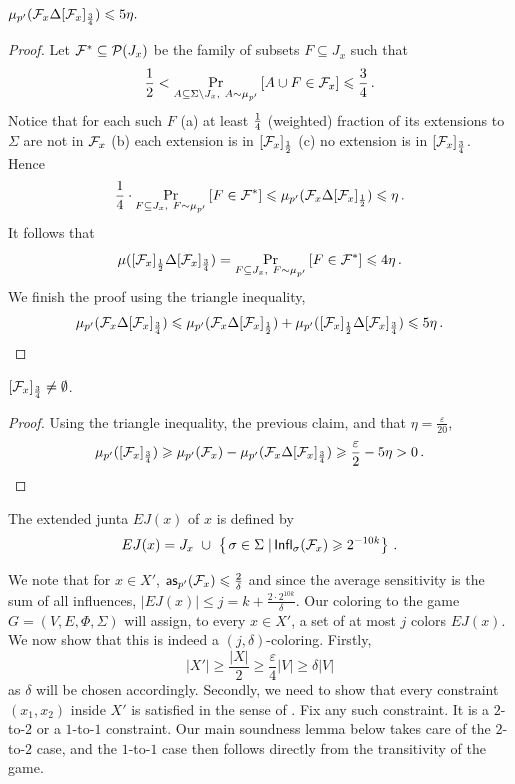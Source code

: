 \documentclass{toc}
\newcommand\sett[2]{\left\{ \left. #1 \;\right\vert #2 \right\}}
\newcommand\Prob[2]{{\Pr_{#1}\left[ {#2} \right]}}
\newcommand\half{{1\over2}}
\newcommand\quarter{{1\over4}}
\newcommand\eps{\varepsilon}
\renewcommand\geq{\geqslant}
\renewcommand\leq{\leqslant}
\begin{document}
\begin{claim}$
\mu_{p'}({\cal F}_x \Delta [ {\cal F}_x ]_{\frac{3}{4}}   )\leqslant 5\eta.
$
\end{claim}
\begin{proof}
Let ${\cal F}^* \subseteq {\cal P}(J_x)$ be the family of subsets $F \subseteq J_x$ such that
\[
\half<\Prob{A \subseteq \Sigma\setminus J_x, ~A\sim \mu_{p'}}{A\cup F \in {\cal F}_x}\leqslant \frac{3}{4}\,.%
\]
Notice that for each such $F$  (a) at least  $\quarter$ (weighted) fraction of its extensions to $\Sigma$ are not in ${\cal F}_x$  (b)
each extension is in $[{\cal F}_x]_\half$ (c) no extension is in $[{\cal F}_x]_{\frac{3}{4}}$. Hence
\[
\quarter\cdot \Prob{F \subseteq J_x, ~F\sim\mu_{p'}}
{F \in {\cal F}^*}\leqslant
\mu_{p'}({\cal F}_x\Delta [{\cal F}_x]_\half)
\leqslant
\eta\,.%
\]
It follows that
\[
\mu([{\cal F}_x]_\frac{1}{2}\Delta [{\cal F}_x]_\frac{3}{4})
=
\Prob{F\subseteq J_x, ~F\sim\mu_{p'}}
{F \in {\cal F}^*} \leqslant 4\eta\,.%
\]
We finish the proof using the triangle inequality,
\[
\mu_{p'}({\cal F}_x\Delta [{\cal F}_x]_{\frac{3}{4}})
\leqslant
\mu_{p'}({\cal F}_x\Delta [{\cal F}_x]_{\frac{1}{2}})
+\mu_{p'}([{\cal F}_x]_\frac{1}{2}\Delta [{\cal F}_x]_\frac{3}{4})
\leqslant 5\eta\,.    \qedhere%
\]
\end{proof}

\begin{claim}\label{claim:inf_non_empty}
 $[{\cal F}_x]_{\frac{3}{4}}\neq \emptyset$.
\end{claim}
\begin{proof}
Using the triangle inequality, the previous claim, and that $\eta = \frac{\eps}{20}$,
\[
\mu_{p'}([{\cal F}_x]_{\frac{3}{4}}) \geqslant
\mu_{p'}({\cal F}_x)-\mu_{p'}({\cal F}_x \Delta [ {\cal F}_x ]_{\frac{3}{4}}   )
 \geqslant \frac{\eps}{2} - 5\eta
> 0\,.      \qedhere%
\]
\end{proof}

\begin{definition}
The extended junta $EJ(x)$ of $x$ is defined by
\[
EJ(x)= J_x ~\cup  ~\sett{\sigma \in \Sigma}{ {\sf Infl}_\sigma({\cal F}_x)\geqslant 2^{-10 k}}\,.%
\]
\end{definition}

We note that for $x \in X'$, ${\sf as}_{p'}({\cal F}_x)\leqslant \frac{2}{\delta}$ and since the average sensitivity is the sum of all influences,
$ |EJ(x)| \leq j = k +  \frac{2 \cdot 2^{10k} }{\delta}$. Our coloring to the game $G=(V,E,\Phi,\Sigma)$ will assign, to
every $x \in X'$, a set of at most $j$ colors $EJ(x)$. We now show that this is indeed a $(j,\delta)$-coloring. Firstly,
 $$|X'| \geq \frac{|X|}{2} \geq \frac{\eps}{4} |V|\geq \delta |V|$$
  as $\delta$ will be chosen accordingly. Secondly, we need
 to show that every constraint $(x_1, x_2)$ inside $X'$ is satisfied in the sense of .
 Fix any such constraint. It is a $2$-to-$2$ or a $1$-to-$1$ constraint. Our main
soundness lemma below takes care of the $2$-to-$2$ case, and the $1$-to-$1$ case then follows directly from the
transitivity of the game.
\end{document}
